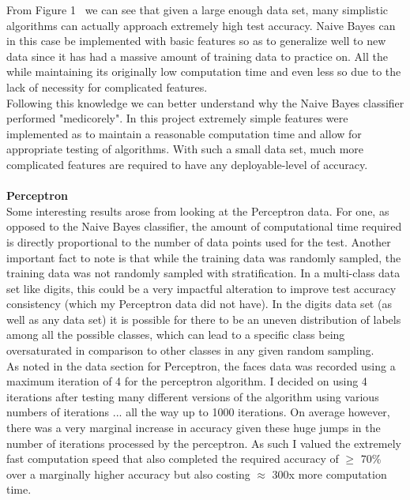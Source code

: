 \documentclass[12pt]{article}
\newcommand\tab[1][1cm]{\hspace*{#1}}
\begin{document}
From Figure 1~\cite{Banko} we can see that given a large enough data set, many simplistic algorithms can actually approach extremely high test accuracy. Naive Bayes can in this case be implemented with basic features so as to generalize well to new data since it has had a massive amount of training data to practice on. All the while maintaining its originally low computation time and even less so due to the lack of necessity for complicated features.  \\
\tab Following this knowledge we can better understand why the Naive Bayes classifier performed "medicorely". In this project extremely simple features were implemented as to maintain a reasonable computation time and allow for appropriate testing of algorithms. With such a small data set, much more complicated features are required to have any deployable-level of accuracy.\\ \\
\textbf{Perceptron} \\
\tab Some interesting results arose from looking at the Perceptron data. For one, as opposed to the Naive Bayes classifier, the amount of computational time required is directly proportional to the number of data points used for the test. Another important fact to note is that while the training data was randomly sampled, the training data was not randomly sampled with stratification. In a multi-class data set like digits, this could be a very impactful alteration to improve test accuracy consistency (which my Perceptron data did not have). In the digits data set (as well as any data set) it is possible for there to be an uneven distribution of labels among all the possible classes, which can lead to a specific class being oversaturated in comparison to other classes in any given random sampling. \\
\tab As noted in the data section for Perceptron, the faces data was recorded using a maximum iteration of 4 for the perceptron algorithm. I decided on using 4 iterations after testing many different versions of the algorithm using various numbers of iterations ... all the way up to 1000 iterations. On average however, there was a very marginal increase in accuracy given these huge jumps in the number of iterations processed by the perceptron. As such I valued the extremely fast computation speed that also completed the required accuracy of $\geq$ 70\% over a marginally higher accuracy but also costing $\approx$ 300x more computation time. \\ \\
\end{document}
